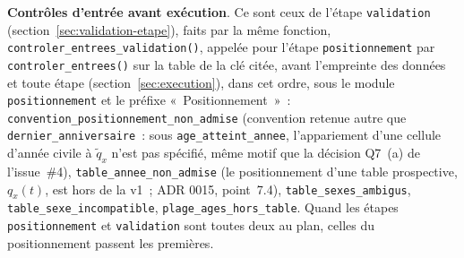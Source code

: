 \documentclass[a4paper,11pt]{article}
\newcommand{\code}[1]{\texttt{\small #1}}
\begin{document}
\medskip
\textbf{Contrôles d'entrée avant exécution}. Ce sont ceux de l'étape
\code{validation} (section~\ref{sec:validation-etape}), faits par la même
fonction, \code{controler\_entrees\_validation()}, appelée pour l'étape
\code{positionnement} par \code{controler\_entrees()} sur la table de la clé
citée, avant l'empreinte des données et toute étape
(section~\ref{sec:execution}), dans cet ordre, sous le module
\code{positionnement} et le préfixe «~Positionnement~»~:
\code{convention\_positionnement\_non\_admise} (convention retenue autre
que \code{dernier\_anniversaire}~: sous \code{age\_atteint\_annee},
l'appariement d'une cellule d'année civile à $\tilde q_x$ n'est pas
spécifié, même motif que la décision Q7~(a) de l'issue~\#4),
\code{table\_annee\_non\_admise} (le positionnement d'une table
prospective, $q_x(t)$, est hors de la v1~; ADR 0015, point~7.4),
\code{table\_sexes\_ambigus}, \code{table\_sexe\_incompatible},
\code{plage\_ages\_hors\_table}. Quand les étapes \code{positionnement} et
\code{validation} sont toutes deux au plan, celles du positionnement
passent les premières.
\end{document}
